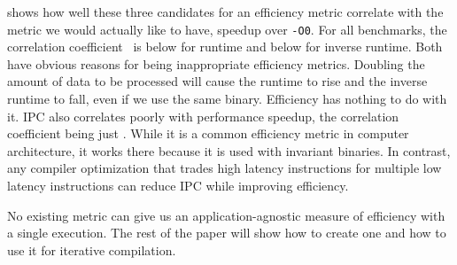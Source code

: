      shows how well these three candidates for an efficiency metric correlate with the metric we would actually like to have,
    speedup over \texttt{-O0}. For all benchmarks, the correlation coefficient~\cite{Bishop:2006:PRM:1162264} is below  for
    runtime and below  for inverse runtime. Both have obvious reasons for being inappropriate efficiency metrics. Doubling the
    amount of data to be processed will cause the runtime to rise and the inverse runtime to fall, even if we use the same binary.
    Efficiency has nothing to do with it. IPC also correlates poorly with performance speedup, the correlation coefficient being just
    . While it is a common efficiency metric in computer architecture, it works there because it is used with invariant binaries.
    In contrast, any compiler optimization that trades high latency instructions for multiple low latency instructions can reduce IPC while
    improving efficiency.
    
    No existing metric can give us an application-agnostic measure of efficiency with a single execution. The rest of the paper will show
    how to create one and how to use it for iterative compilation. 

